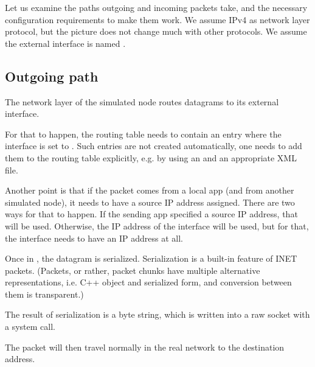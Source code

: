 Let us examine the paths outgoing and incoming packets take, and the
necessary configuration requirements to make them work. We assume IPv4
as network layer protocol, but the picture does not change much with
other protocols. We assume the external interface is named .

\subsection*{Outgoing path}
 
The network layer of the simulated node routes datagrams to its
 external interface. 

For that to happen, the routing table needs to contain an entry 
where the interface is set to . Such entries are
not created automatically, one needs to add them to the routing 
table explicitly, e.g. by using an 
and an appropriate XML file. 

Another point is that if the packet comes from a local app (and from
another simulated node), it needs to have a source IP address assigned.
There are two ways for that to happen. If the sending app specified
a source IP address, that will be used. Otherwise, the IP address
of the  interface will be used, but for that, the interface
needs to have an IP address at all. 

Once in , the datagram is serialized.
Serialization is a built-in feature of INET packets. (Packets, or rather,
packet chunks have multiple alternative representations, i.e. C++ object 
and serialized form, and conversion between them is transparent.) 

The result of serialization is a byte string, which is written into 
a raw socket with a  system call.


The packet will then travel normally in the real network to the 
destination address.

